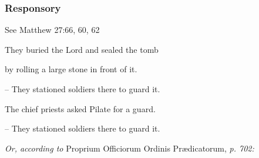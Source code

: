 \subsubsection{Responsory}
 \hfill See Matthew 27:66, 60, 62
 
 They buried the Lord and sealed the tomb\par
 by rolling a large stone in front of it.\par
 – They stationed soldiers there to guard it.\par
 \vspace{5pt}
 The chief priests asked Pilate for a guard.\par
 – They stationed soldiers there to guard it.
 
 \vspace{5pt}

\textit{Or, according to} Proprium Officiorum Ordinis Prædicatorum, \textit{p. 702:}

